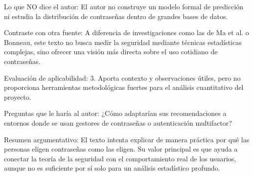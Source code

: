 \documentclass[12pt, letterpaper]{article}
\begin{document}
\noindent
Lo que NO dice el autor: El autor no construye un modelo formal de predicción ni estudia la distribución de contraseñas dentro de grandes bases de datos. \newline

\noindent
Contraste con otra fuente: A diferencia de investigaciones como las de Ma et al. o Bonneau, este texto no busca medir la seguridad mediante técnicas estadísticas complejas, sino ofrecer una visión más directa sobre el uso cotidiano de contraseñas.   \newline 

\noindent
Evaluación de aplicabilidad: 3. Aporta contexto y observaciones útiles, pero no proporciona herramientas metodológicas fuertes para el análisis cuantitativo del proyecto. \newline

\noindent
Preguntas que le haría al autor: ¿Cómo adaptarían sus recomendaciones a entornos donde se usan gestores de contraseñas o autenticación multifactor? \newline

\noindent
Resumen argumentativo: El texto intenta explicar de manera práctica por qué las personas eligen contraseñas como las eligen. Su valor principal es que ayuda a conectar la teoría de la seguridad con el comportamiento real de los usuarios, aunque no es suficiente por sí solo para un análisis estadístico profundo.
\end{document}
